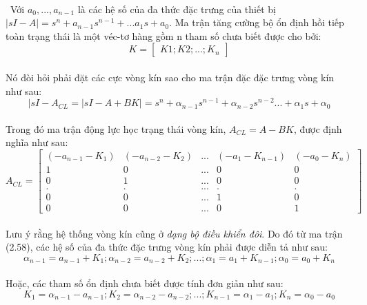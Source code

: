 \paragraph{} Với $a_{0},..., a_{n-1}$ là các hệ số của đa thức đặc trưng của thiết bị $|sI - A| = s^{n} + a_{n-1}s^{n-1} + ... a_{1}s + a_{0}$. Ma trận tăng cường bộ ổn định hồi tiếp toàn trạng thái là một véc-tơ hàng gồm n tham số chưa biết được cho bởi:
\begin{equation}
K = 
\begin{bmatrix}
K1; K2; ...; K_{n}
\end{bmatrix}
\end{equation}
\paragraph{}Nó đòi hỏi phải đặt các cực vòng kín sao cho ma trận đặc đặc trưng vòng kín như sau:
\begin{equation}
|sI - A_{CL} = |sI - A + BK| = s^{n} + \alpha_{n-1}s^{n-1} + \alpha_{n-2}s^{n-2} ... + \alpha_{1}s + \alpha_{0}
\end{equation}
\paragraph{}Trong đó ma trận động lực học trạng thái vòng kín, $A_{CL} = A - BK$, được định nghĩa như sau:
\begin{equation}
A_{CL} = 
\begin{bmatrix}
(-a_{n-1} - K_{1}) & (-a_{n-2} - K_{2}) & ... & (-a_{1} - K_{n-1}) & (-a_{0} - K_{n})\\
1 & 0 & ... & 0 & 0\\
0& 1 & ... & 0 & 0\\
.&.&...&.&.\\
0&0&...&1&0\\
0&0&...&0&1
\end{bmatrix}
\end{equation}
\paragraph{}Lưu ý rằng hệ thống vòng kín cũng ở \textit{dạng bộ điều khiển đôi}. Do đó từ ma trận (2.58), các hệ số của đa thức đặc trưng vòng kín phải được diễn tả như sau:
\begin{equation}
\alpha_{n-1} = a_{n-1} + K_{1}; \alpha_{n-2} = a_{n-2} + K_{2}; ...; \alpha_{1} = a_{1}+K_{n-1}; \alpha_{0} = a_{0} + K_{n}
\end{equation} 
\paragraph{}Hoặc, các tham số ổn định chưa biết được tính đơn giản như sau:
\begin{equation}
K_{1} = \alpha_{n-1} - a_{n-1}; K_{2} = \alpha_{n-2} - a_{n-2}; ...; K_{n-1} = \alpha_{1} - a_{1}; K_{n} = \alpha_{0} - a_{0}
\end{equation}
